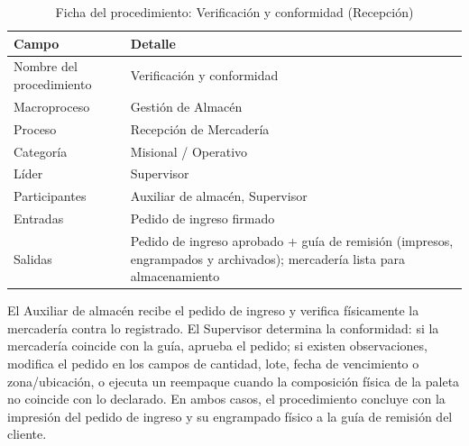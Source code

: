\documentclass[11pt, a4paper, oneside]{report}
\begin{document}
\begin{table}[H]
\centering\small
\renewcommand{\arraystretch}{1.25}
\setlength{\tabcolsep}{6pt}
\begin{tabularx}{\textwidth}{|>{\raggedright\arraybackslash}p{}|>{\raggedright\arraybackslash}X|}
\hline
\rowcolor{upeu_mid}
\color{white}\bfseries Campo & \color{white}\bfseries Detalle \\ \hline
\rowcolor{gray!10}
Nombre del procedimiento & Verificación y conformidad \\ \hline
Macroproceso & Gestión de Almacén \\ \hline
\rowcolor{gray!10}
Proceso & Recepción de Mercadería \\ \hline
Categoría & Misional / Operativo \\ \hline
Líder & Supervisor \\ \hline
\rowcolor{gray!10}
Participantes & Auxiliar de almacén, Supervisor \\ \hline
Entradas & Pedido de ingreso firmado \\ \hline
\rowcolor{gray!10}
Salidas & Pedido de ingreso aprobado + guía de remisión (impresos, engrampados y archivados); mercadería lista para almacenamiento \\ \hline
\end{tabularx}
\caption{Ficha del procedimiento: Verificación y conformidad (Recepción)}
\end{table}

El Auxiliar de almacén recibe el pedido de ingreso y verifica físicamente la mercadería contra lo registrado. El Supervisor determina la conformidad: si la mercadería coincide con la guía, aprueba el pedido; si existen observaciones, modifica el pedido en los campos de cantidad, lote, fecha de vencimiento o zona/ubicación, o ejecuta un reempaque cuando la composición física de la paleta no coincide con lo declarado. En ambos casos, el procedimiento concluye con la impresión del pedido de ingreso y su engrampado físico a la guía de remisión del cliente.
\end{document}
